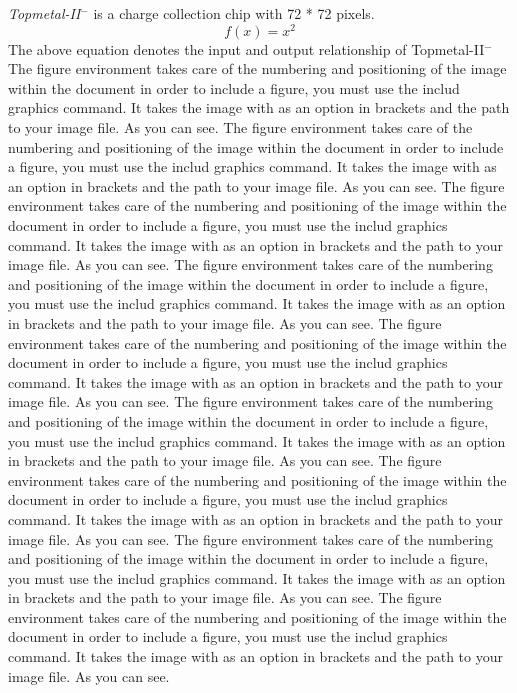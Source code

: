 \documentclass[18pt]{article}
\begin{document}
\emph{Topmetal-II$^-$} is a charge collection chip with 72 * 72 pixels.
\begin{equation}
f(x) = x^2 
\end{equation}
The above equation denotes the input and output relationship of Topmetal-II$^-$
The figure environment takes care of the numbering and positioning of the image within the document in order to include a figure, you must use the includ graphics command. It takes the image with as an option in brackets and the path to your image file.  As you can see.
The figure environment takes care of the numbering and positioning of the image within the document in order to include a figure, you must use the includ graphics command. It takes the image with as an option in brackets and the path to your image file.  As you can see.
The figure environment takes care of the numbering and positioning of the image within the document in order to include a figure, you must use the includ graphics command. It takes the image with as an option in brackets and the path to your image file.  As you can see.
The figure environment takes care of the numbering and positioning of the image within the document in order to include a figure, you must use the includ graphics command. It takes the image with as an option in brackets and the path to your image file.  As you can see.
The figure environment takes care of the numbering and positioning of the image within the document in order to include a figure, you must use the includ graphics command. It takes the image with as an option in brackets and the path to your image file.  As you can see.
The figure environment takes care of the numbering and positioning of the image within the document in order to include a figure, you must use the includ graphics command. It takes the image with as an option in brackets and the path to your image file.  As you can see.
The figure environment takes care of the numbering and positioning of the image within the document in order to include a figure, you must use the includ graphics command. It takes the image with as an option in brackets and the path to your image file.  As you can see.
The figure environment takes care of the numbering and positioning of the image within the document in order to include a figure, you must use the includ graphics command. It takes the image with as an option in brackets and the path to your image file.  As you can see.
The figure environment takes care of the numbering and positioning of the image within the document in order to include a figure, you must use the includ graphics command. It takes the image with as an option in brackets and the path to your image file.  As you can see.
\end{document}
